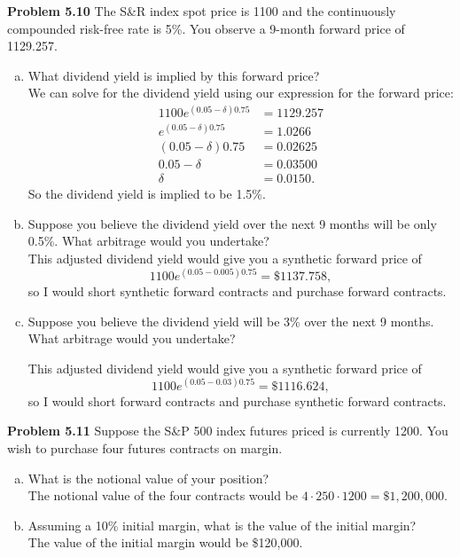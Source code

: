 \documentclass[12pt]{article}
\newcommand{\problem}[1]{\bigskip \noindent \textbf{Problem #1}}
\theoremstyle{plain}
\begin{document}
\problem{5.10} The S\&R index spot price is 1100 and the continuously compounded risk-free rate is 5\%. You observe a 9-month forward price of 1129.257.
\begin{enumerate}[(a)]
\item What dividend yield is implied by this forward price?\\

We can solve for the dividend yield using our expression for the forward price:
\begin{align*}
1100e^{(0.05-\delta)0.75} &= 1129.257\\
e^{(0.05-\delta)0.75} &= 1.0266\\
(0.05-\delta)0.75 &= 0.02625\\
0.05 - \delta &= 0.03500\\
\delta &= 0.0150.
\end{align*}
So the dividend yield is implied to be 1.5\%.

\item Suppose you believe the dividend yield over the next 9 months will be only 0.5\%. What arbitrage would you undertake?\\

This adjusted dividend yield would give you a synthetic forward price of
\[
1100e^{(0.05-0.005)0.75} = \$1137.758,
\]
so I would short synthetic forward contracts and purchase forward contracts.

\item Suppose you believe the dividend yield will be 3\% over the next 9 months. What arbitrage would you undertake?

This adjusted dividend yield would give you a synthetic forward price of
\[
1100e^{(0.05-0.03)0.75} = \$1116.624,
\]
so I would short forward contracts and purchase synthetic forward contracts.
\end{enumerate}

\problem{5.11} Suppose the S\&P 500 index futures priced is currently 1200. You wish to purchase four futures contracts on margin.
\begin{enumerate}[(a)]
\item What is the notional value of your position?\\

The notional value of the four contracts would be $4 \cdot 250 \cdot 1200 = \$1,200,000$. 

\item Assuming a 10\% initial margin, what is the value of the initial margin?\\

The value of the initial margin would be \$120,000.
\end{enumerate}
\end{document}

